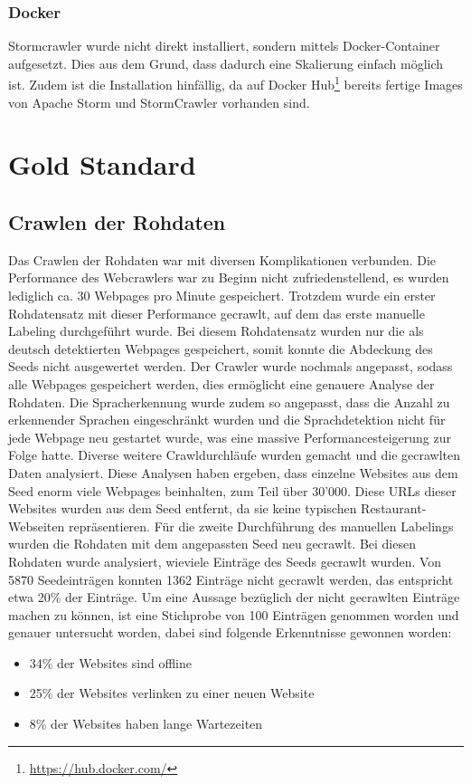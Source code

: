 \subsubsection{Docker}
Stormcrawler wurde nicht direkt installiert, sondern mittels Docker-Container aufgesetzt.
Dies aus dem Grund, dass dadurch eine Skalierung einfach möglich ist.
Zudem ist die Installation hinfällig, da auf Docker Hub\footnote{\url{https://hub.docker.com/}} bereits fertige Images von Apache Storm und StormCrawler vorhanden sind.
\section{Gold Standard}
\subsection{Crawlen der Rohdaten}
Das Crawlen der Rohdaten war mit diversen Komplikationen verbunden.
Die Performance des Webcrawlers war zu Beginn nicht zufriedenstellend, es wurden lediglich ca. 30 Webpages pro Minute gespeichert.
Trotzdem wurde ein erster Rohdatensatz mit dieser Performance gecrawlt, auf dem das erste manuelle Labeling durchgeführt wurde.
Bei diesem Rohdatensatz wurden nur die als deutsch detektierten Webpages gespeichert, somit konnte die Abdeckung des Seeds nicht ausgewertet werden.
Der Crawler wurde nochmals angepasst, sodass alle Webpages gespeichert werden, dies ermöglicht eine genauere Analyse der Rohdaten.
Die Spracherkennung wurde zudem so angepasst, dass die Anzahl zu erkennender Sprachen eingeschränkt wurden und die Sprachdetektion nicht für jede Webpage neu gestartet wurde, was eine massive Performancesteigerung zur Folge hatte.
Diverse weitere Crawldurchläufe wurden gemacht und die gecrawlten Daten analysiert.
Diese Analysen haben ergeben, dass einzelne Websites aus dem Seed enorm viele Webpages beinhalten, zum Teil über 30'000.
Diese URLs dieser Websites wurden aus dem Seed entfernt, da sie keine typischen Restaurant-Webseiten repräsentieren.
Für die zweite Durchführung des manuellen Labelings wurden die Rohdaten mit dem angepassten Seed neu gecrawlt.
Bei diesen Rohdaten wurde analysiert, wieviele Einträge des Seeds gecrawlt wurden.
Von 5870 Seedeinträgen konnten 1362 Einträge nicht gecrawlt werden, das entspricht etwa 20\% der Einträge.
Um eine Aussage bezüglich der nicht gecrawlten Einträge machen zu können, ist eine Stichprobe von 100 Einträgen genommen worden und genauer untersucht worden, dabei sind folgende Erkenntnisse gewonnen worden:
\begin{itemize}
	\item 34\% der Websites sind offline
	\item 25\% der Websites verlinken zu einer neuen Website
	\item 8\% der Websites haben lange Wartezeiten
\end{itemize}
